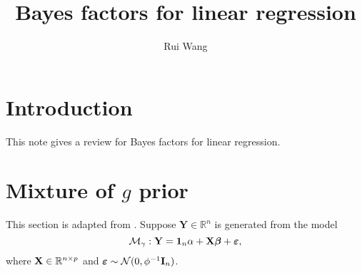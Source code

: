\documentclass[11pt]{article}
\title{Bayes factors for linear regression}
\author[1]{Rui Wang}
\newcommand{\BY}{\mathbf{Y}}    \newcommand{\BZ}{\mathbf{Z}}
\newcommand{\bfsym}[1]{\ensuremath{\boldsymbol{#1}}}
\def\bbeta{\bfsym \beta}
\theoremstyle{plain}
\theoremstyle{definition}
\theoremstyle{remark}
\begin{document}
\maketitle
\section{Introduction}
This note gives a review for Bayes factors for linear regression.
\section{Mixture of $g$ prior}
This section is adapted from \cite{Liang2008Mixtures}.
Suppose $\BY\in \mathbb R^n$ is generated from the model
\begin{equation*}
    \mathcal M_{\gamma}: \BY=\mathbf 1_n \alpha + \BX \bbeta+\bepsilon,
\end{equation*}
where $\mathbf{X} \in \mathbb R^{n\times p}$ and $\bepsilon\sim \mathcal N (0, \phi^{-1} \BI_n)$.
\end{document}

